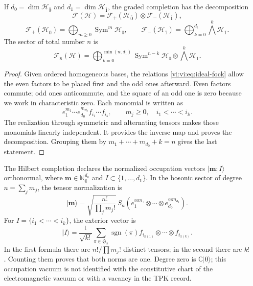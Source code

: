 \begin{theorem}
\label{vi:vi:thm:fock-graduado}
If \(d_0=\dim\mathcal H_{\bar0}\) and
\(d_1=\dim\mathcal H_{\bar1}\), the graded completion has
the decomposition
\begin{equation}
 \mathcal F(\mathcal H)=
 \mathcal F_+(\mathcal H_{\bar0})\otimes
 \mathcal F_-(\mathcal H_{\bar1}),
 \label{vi:vi:eq:fock-producto}
\end{equation}
\[
 \mathcal F_+(\mathcal H_{\bar0})=
 \bigoplus_{m\ge0}\operatorname{Sym}^m\mathcal H_{\bar0},
 \qquad
 \mathcal F_-(\mathcal H_{\bar1})=
 \bigoplus_{k=0}^{d_1}\bigwedge^k\mathcal H_{\bar1}.
\]
The sector of total number \(n\) is
\[
 \mathcal F_n(\mathcal H)=
 \bigoplus_{k=0}^{\min(n,d_1)}
 \operatorname{Sym}^{n-k}\mathcal H_{\bar0}
 \otimes\bigwedge^k\mathcal H_{\bar1}.
\]
\end{theorem}
\begin{proof}
Given ordered homogeneous bases, the relations
\eqref{vi:vi:eq:ideal-fock} allow the even factors to be placed first
and the odd ones afterward. Even factors commute; odd ones anticommute,
and the square of an odd one is zero because we work in characteristic
zero. Each monomial is written as
\[
 e_1^{m_1}\cdots e_{d_0}^{m_{d_0}}
 f_{i_1}\cdots f_{i_k},
 \qquad m_j\ge0,\quad i_1<\cdots<i_k.
\]
The realization through symmetric and alternating tensors makes
those monomials linearly independent. It provides the inverse
map and proves the decomposition. Grouping them by
\(m_1+\cdots+m_{d_0}+k=n\) gives the last statement.
\end{proof}

The Hilbert completion declares the normalized occupation
vectors \(|\boldsymbol m;I\rangle\) orthonormal, where
\(\boldsymbol m\in\mathbb N_0^{d_0}\) and
\(I\subset\{1,\ldots,d_1\}\). In the bosonic sector of degree
\(n=\sum_jm_j\), the tensor normalization is
\[
 |\boldsymbol m\rangle=
 \sqrt{\frac{n!}{\prod_jm_j!}}\,
 S_n(e_1^{\otimes m_1}\otimes\cdots\otimes
 e_{d_0}^{\otimes m_{d_0}}).
\]
For \(I=\{i_1<\cdots<i_k\}\), the exterior vector is
\[
 |I\rangle=\frac1{\sqrt{k!}}\sum_{\pi\in\mathfrak S_k}
 \operatorname{sgn}(\pi)
 f_{i_{\pi(1)}}\otimes\cdots\otimes f_{i_{\pi(k)}}.
\]
In the first formula there are \(n!/\prod m_j!\) distinct tensors;
in the second there are \(k!\). Counting them proves that both norms are one.
Degree zero is \(\mathbb C|0\rangle\); this occupation vacuum
is not identified with the constitutive chart of the electromagnetic vacuum
or with a vacancy in the TPK record.

